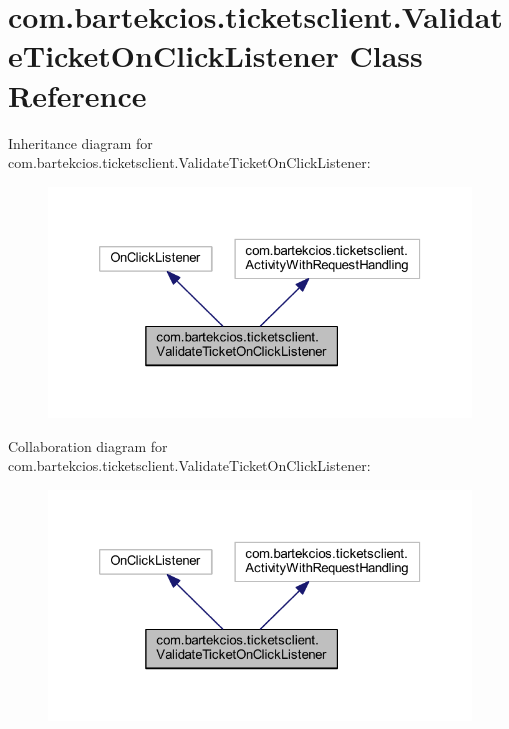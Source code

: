 \hypertarget{classcom_1_1bartekcios_1_1ticketsclient_1_1_validate_ticket_on_click_listener}{}\section{com.\+bartekcios.\+ticketsclient.\+Validate\+Ticket\+On\+Click\+Listener Class Reference}
\label{classcom_1_1bartekcios_1_1ticketsclient_1_1_validate_ticket_on_click_listener}


Inheritance diagram for com.\+bartekcios.\+ticketsclient.\+Validate\+Ticket\+On\+Click\+Listener\+:
\nopagebreak
\begin{figure}[H]
\begin{center}
\leavevmode
\includegraphics[width=326pt]{classcom_1_1bartekcios_1_1ticketsclient_1_1_validate_ticket_on_click_listener__inherit__graph}
\end{center}
\end{figure}


Collaboration diagram for com.\+bartekcios.\+ticketsclient.\+Validate\+Ticket\+On\+Click\+Listener\+:
\nopagebreak
\begin{figure}[H]
\begin{center}
\leavevmode
\includegraphics[width=326pt]{classcom_1_1bartekcios_1_1ticketsclient_1_1_validate_ticket_on_click_listener__coll__graph}
\end{center}
\end{figure}
